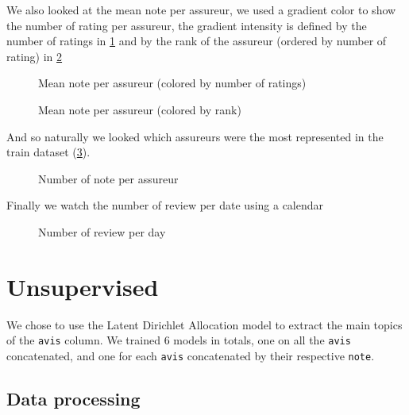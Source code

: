 \documentclass[a4paper, 12pt, one column]{article}
\begin{document}
\restoregeometry

We also looked at the mean note per assureur, we used a gradient color to show the number of rating per assureur, the gradient intensity is defined by the number of ratings in \cref{fig:mean_note_per_assureur} and by the rank of the assureur (ordered by number of rating) in \cref{fig:mean_note_per_assureur_linear}

\begin{figure}[H]
    \advance\leftskip-3cm
    
    \caption{Mean note per assureur (colored by number of ratings)}
    \label{fig:mean_note_per_assureur}
\end{figure}
\begin{figure}[H]
    \advance\leftskip-3cm
    
    \caption{Mean note per assureur (colored by rank)}
    \label{fig:mean_note_per_assureur_linear}
\end{figure}
\restoregeometry

And so naturally we looked which assureurs were the most represented in the train dataset (\cref{fig:nbnote_per_assureur}).

\begin{figure}[H]
    \advance\leftskip-2.5cm
    
    \caption{Number of note per assureur}
    \label{fig:nbnote_per_assureur}
\end{figure}

Finally we watch the number of review per date using a calendar

\begin{figure}[H]
    \centering
    
    \caption{Number of review per day}
    \label{fig:count_calendar}
\end{figure}
\restoregeometry

\section{Unsupervised}

We chose to use the Latent Dirichlet Allocation model to extract the main topics of the \lstinline{avis} column.
We trained 6 models in totals, one on all the \lstinline{avis} concatenated, and one for each \lstinline{avis} concatenated by their respective \lstinline{note}.

\subsection{Data processing}
\end{document}
